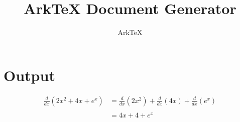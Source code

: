 \documentclass[dvips, 12pt, twoside]{article}
\begin{document}
\title{ArkTeX Document Generator}
\author{ArkTeX}
\maketitle

\medskip

\section*{Output}
\begin{Large}
\begin{align*}
\frac{d}{dx}(2x^2+4x+e^{x})&=\frac{d}{dx}(2x^2)+\frac{d}{dx}(4x)+\frac{d}{dx}(e^{x})\\
\\
&=4x+4+e^{x}\\
\\
\end{align*}
\end{Large}
\end{document}

